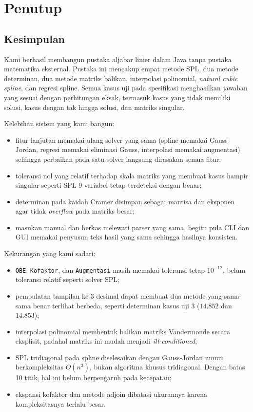 \clearpage
\section{Penutup}

\subsection{Kesimpulan}

Kami berhasil membangun pustaka aljabar linier dalam Java tanpa pustaka matematika eksternal. Pustaka ini mencakup empat metode SPL, dua metode determinan, dua metode matriks balikan, interpolasi polinomial, \textit{natural cubic spline}, dan regresi spline. Semua kasus uji pada spesifikasi menghasilkan jawaban yang sesuai dengan perhitungan eksak, termasuk kasus yang tidak memiliki solusi, kasus dengan tak hingga solusi, dan matriks singular.

Kelebihan sistem yang kami bangun:
\begin{itemize}[nosep]
  \item fitur lanjutan memakai ulang solver yang sama (spline memakai Gauss-Jordan, regresi memakai eliminasi Gauss, interpolasi memakai augmentasi) sehingga perbaikan pada satu solver langsung dirasakan semua fitur;
  \item toleransi nol yang relatif terhadap skala matriks yang membuat kasus hampir singular seperti SPL 9 variabel tetap terdeteksi dengan benar;
  \item determinan pada kaidah Cramer disimpan sebagai mantisa dan eksponen agar tidak \textit{overflow} pada matriks besar;
  \item masukan manual dan berkas melewati parser yang sama, begitu pula CLI dan GUI memakai penyusun teks hasil yang sama sehingga hasilnya konsisten.
\end{itemize}

Kekurangan yang kami sadari:
\begin{itemize}[nosep]
  \item \texttt{OBE}, \texttt{Kofaktor}, dan \texttt{Augmentasi} masih memakai toleransi tetap $10^{-12}$, belum toleransi relatif seperti solver SPL;
  \item pembulatan tampilan ke 3 desimal dapat membuat dua metode yang sama-sama benar terlihat berbeda, seperti determinan kasus uji 3 ($14.852$ dan $14.853$);
  \item interpolasi polinomial membentuk balikan matriks Vandermonde secara eksplisit, padahal matriks ini mudah menjadi \textit{ill-conditioned};
  \item SPL tridiagonal pada spline diselesaikan dengan Gauss-Jordan umum berkompleksitas $O(n^3)$, bukan algoritma khusus tridiagonal. Dengan batas 10 titik, hal ini belum berpengaruh pada kecepatan;
  \item ekspansi kofaktor dan metode adjoin dibatasi ukurannya karena kompleksitasnya terlalu besar.
\end{itemize}

